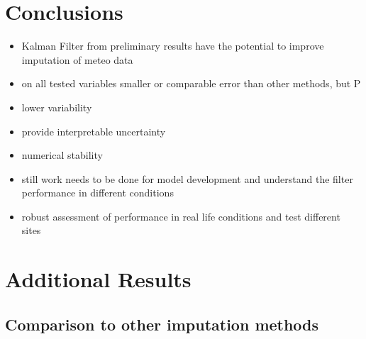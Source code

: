 \documentclass{article}
\let\Oldsection\section
\renewcommand{\section}{\FloatBarrier\Oldsection}
\let\Oldsubsection\subsection
\renewcommand{\subsection}{\FloatBarrier\Oldsubsection}
\begin{document}





\section{Conclusions}

\begin{itemize}
    \item Kalman Filter from preliminary results have the potential to improve imputation of meteo data
    \item on all tested variables smaller or comparable error than other methods, but P
    \item lower variability
    \item provide interpretable uncertainty
    \item numerical stability
    \item still work needs to be done for model development and understand the filter performance in different conditions
    \item robust assessment of performance in real life conditions and test different sites
\end{itemize}


\printbibliography

\appendix

\FloatBarrier


\section{Additional Results}

\subsection{Comparison to other imputation methods}
\end{document}
